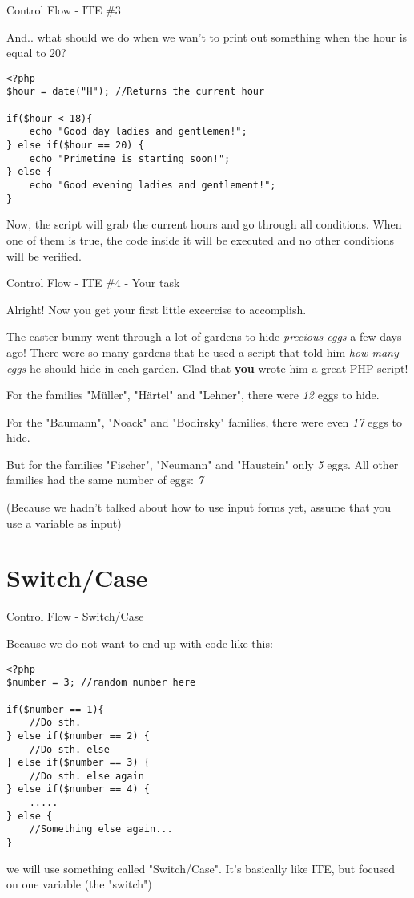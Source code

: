 \begin{frame}[fragile]{Control Flow - ITE \#{}3}

And.. what should we do when we wan't to print out something when the hour is equal to 20? \pause
\begin{lstlisting}
<?php
$hour = date("H"); //Returns the current hour

if($hour < 18){
	echo "Good day ladies and gentlemen!";
} else if($hour == 20) {
    echo "Primetime is starting soon!";
} else {
    echo "Good evening ladies and gentlement!";
}
\end{lstlisting} 
\pause

Now, the script will grab the current hours and go through all conditions. When one of them is true, the code inside it will be executed and no other conditions will be verified.
\end{frame}

\begin{frame}[fragile]{Control Flow - ITE \#{}4 - Your task}

Alright! Now you get your first little excercise to accomplish. \pause

The easter bunny went through a lot of gardens to hide \emph{precious eggs} a few days ago! There were so many gardens that he used a script that told him \emph{how many eggs} he should hide in each garden. Glad that \textbf{you} wrote him a great PHP script!

For the families "Müller", "Härtel" and "Lehner", there were \emph{12} eggs to hide. 

For the "Baumann", "Noack" and "Bodirsky" families, there were even \emph{17} eggs to hide.

But for the families "Fischer", "Neumann" and "Haustein" only \emph{5} eggs. All other families had the same number of eggs: \emph{7}

(Because we hadn't talked about how to use input forms yet, assume that you use a variable as input) 
\end{frame}

\section{Switch/Case}

\begin{frame}[fragile]{Control Flow - Switch/Case}

Because we do not want to end up with code like this:
\begin{lstlisting}
<?php
$number = 3; //random number here

if($number == 1){
	//Do sth.
} else if($number == 2) {
    //Do sth. else 
} else if($number == 3) {
    //Do sth. else again
} else if($number == 4) {
    .....
} else {
    //Something else again...
}
\end{lstlisting} 
\pause

we will use something called "Switch/Case". It's basically like ITE, but focused on one variable (the "switch")

\end{frame}

